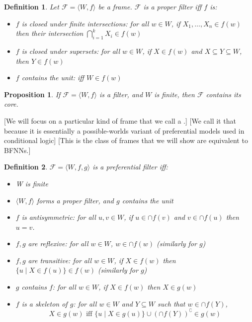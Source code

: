 \documentclass{article}
\newcommand{\infixiff}{\text{ iff }}
\newcommand{\tmtextit}[1]{\text{{\itshape{#1}}}}
\newtheorem{definition}{Definition}
\newtheorem{proposition}{Proposition}
\providecommand{\infixiff}{\mathbin{\text{ iff }}}
\begin{document}
\begin{definition}
  {\cite[Definition 1.4]{pacuit2017neighborhood}} Let $\mathcal{F} = \langle
  W, f \rangle$ be a frame. $\mathcal{F}$ is a proper filter iff $f$ is:
  \begin{itemize}
    \item $f$ is closed under finite intersections: for all $w \in W$, if
    $X_1, \ldots, X_n \in f (w)$ then their intersection $\bigcap^k_{i = 1}
    X_i \in f (w)$
    
    \item $f$ is closed under supersets: for all $w \in W$, if $X \in f (w)$
    and $X \subseteq Y \subseteq W$, then $Y \in f (w)$
    
    \item $f$ contains the unit: iff $W \in f (w)$
  \end{itemize}
\end{definition}

\begin{proposition}
  {\cite[Corollary 1.1]{pacuit2017neighborhood}}
  \label{filter-contains-core}If $\mathcal{F} = \langle W, f \rangle$ is a
  filter, and $W$ is finite, then $\mathcal{F}$ contains its core.
\end{proposition}

[We will focus on a particular kind of frame that we call a
\tmtextit{preferential filter}.] [We call it that because it is essentially a
possible-worlds variant of preferential models used in conditional logic]
[This is the class of frames that we will show are equivalent to BFNNs.]

\begin{definition}
  $\mathcal{F} = \langle W, f, g \rangle$ is a preferential filter iff:
  \begin{itemize}
    \item W is finite
    
    \item $\langle W, f \rangle$ forms a proper filter, and $g$ contains the
    unit
    
    \item $f$ is antisymmetric: for all $u, v \in W$, if $u \in \cap f (v)$
    and $v \in \cap f (u)$ then $u = v$.
    
    \item $f, g$ are reflexive: for all $w \in W$, $w \in \cap f (w)$
    (similarly for $g$)
    
    \item $f, g$ are transitive: for all $w \in W$, if $X \in f (w)$ then $\{
    u \mid X \in f (u) \} \in f (w)$ (similarly for $g$)
    
    \item $g$ contains $f$: for all $w \in W$, if $X \in f (w)$ then $X \in g
    (w)$
    
    \item $f$ is a skeleton of $g$: for all $w \in W$ and $Y \subseteq W$ such
    that $w \in \cap f (Y)$,
    \[ X \in g (w) \infixiff \{ u \mid X \in g (u) \} \cup (\cap f
       (Y))^{\complement} \in g (w) \]
  \end{itemize}
\end{definition}
\end{document}
